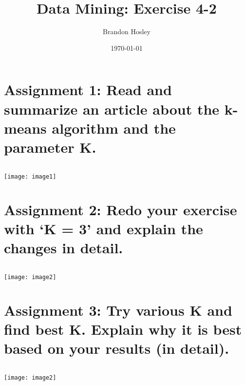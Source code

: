 \documentclass[]{article}
\title{Data Mining: Exercise 4-2}
\author{Brandon Hosley}
\date{\today}
\begin{document}
\maketitle

\section*{Assignment 1: Read and summarize an article about the k-means algorithm and the parameter K.}

\begin{verbatim}

\end{verbatim}
\texttt{[image: image1]}


\section*{Assignment 2: Redo your exercise with ‘K = 3’ and explain the changes in detail.}


\begin{verbatim}

\end{verbatim}
\texttt{[image: image2]}


\section*{Assignment 3: Try various K and find best K. Explain why it is best based on your results (in detail).}

\begin{verbatim}

\end{verbatim}
\texttt{[image: image2]}
\end{document}
